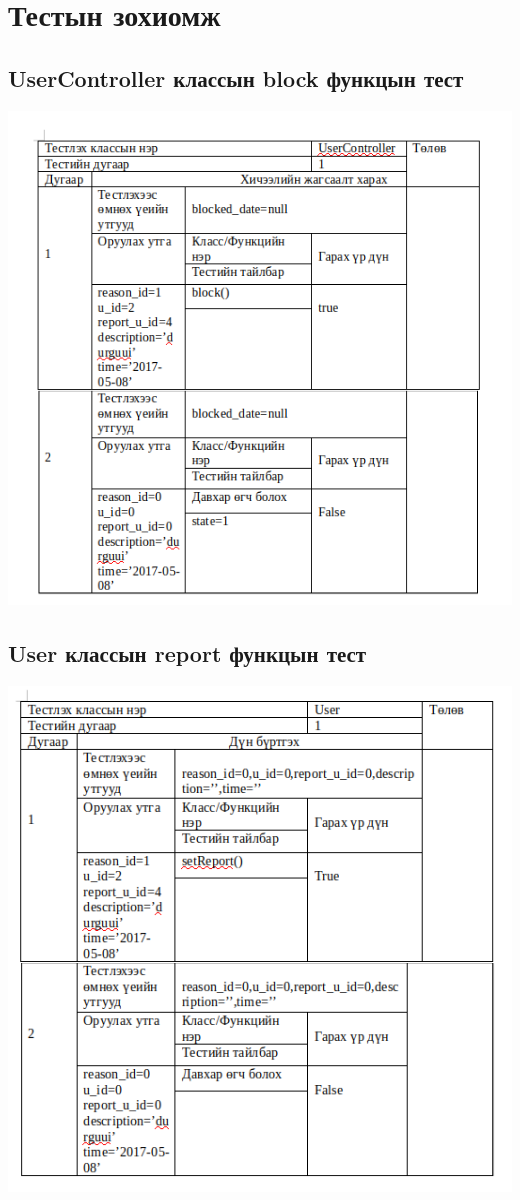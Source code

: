 \documentclass[
oneside, %
english, %
onehalfspacing, %
nolistspacing, %
headsepline, %
]{article} %
\begin{document}
     \section{ Тестын зохиомж }
      \subsection{UserController классын block функцын тест }
     \includegraphics[width=\textwidth]{test1}
      \subsection{User классын report функцын тест}
     \includegraphics[width=\textwidth]{test2}
     
\end{document}
